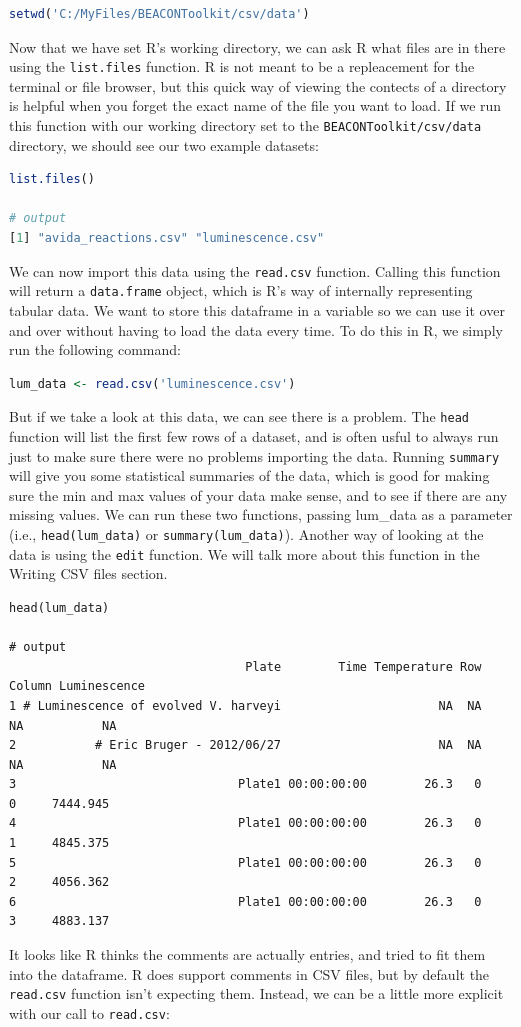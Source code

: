 \begin{lstlisting}[language=R]
setwd('C:/MyFiles/BEACONToolkit/csv/data')
\end{lstlisting}
Now that we have set R's working directory, we can ask R what files are
in there using the \lstinline!list.files! function. R is not meant to be
a repleacement for the terminal or file browser, but this quick way of
viewing the contects of a directory is helpful when you forget the exact
name of the file you want to load. If we run this function with our
working directory set to the \lstinline!BEACONToolkit/csv/data!
directory, we should see our two example datasets:

\begin{lstlisting}[language=R]
list.files()

# output
[1] "avida_reactions.csv" "luminescence.csv" 
\end{lstlisting}
We can now import this data using the \lstinline!read.csv! function.
Calling this function will return a \lstinline!data.frame! object, which
is R's way of internally representing tabular data. We want to store
this dataframe in a variable so we can use it over and over without
having to load the data every time. To do this in R, we simply run the
following command:

\begin{lstlisting}[language=R]
lum_data <- read.csv('luminescence.csv')
\end{lstlisting}
But if we take a look at this data, we can see there is a problem. The
\lstinline!head! function will list the first few rows of a dataset, and
is often usful to always run just to make sure there were no problems
importing the data. Running \lstinline!summary! will give you some
statistical summaries of the data, which is good for making sure the min
and max values of your data make sense, and to see if there are any
missing values. We can run these two functions, passing lum\_data as a
parameter (i.e., \lstinline!head(lum_data)! or
\lstinline!summary(lum_data)!). Another way of looking at the data is
using the \lstinline!edit! function. We will talk more about this
function in the Writing CSV files section.

\begin{lstlisting}
head(lum_data)

# output
                                 Plate        Time Temperature Row Column Luminescence
1 # Luminescence of evolved V. harveyi                      NA  NA     NA           NA
2           # Eric Bruger - 2012/06/27                      NA  NA     NA           NA
3                               Plate1 00:00:00:00        26.3   0      0     7444.945
4                               Plate1 00:00:00:00        26.3   0      1     4845.375
5                               Plate1 00:00:00:00        26.3   0      2     4056.362
6                               Plate1 00:00:00:00        26.3   0      3     4883.137
\end{lstlisting}
It looks like R thinks the comments are actually entries, and tried to
fit them into the dataframe. R does support comments in CSV files, but
by default the \lstinline!read.csv! function isn't expecting them.
Instead, we can be a little more explicit with our call to
\lstinline!read.csv!:

